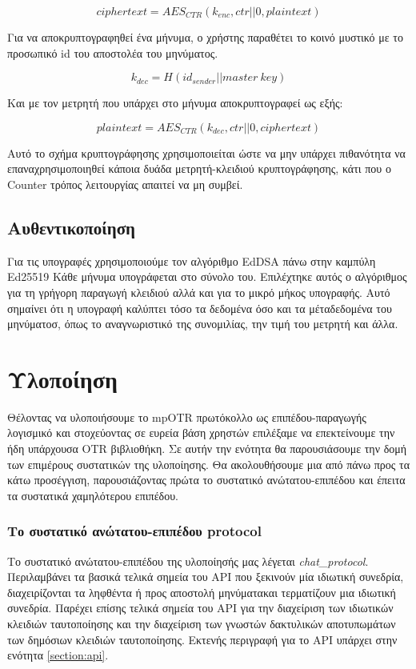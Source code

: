 \[
ciphertext = AES_{CTR}(k_{enc}, ctr||0, plaintext)
\]

Για να αποκρυπτογραφηθεί ένα μήνυμα, ο χρήστης παραθέτει το κοινό μυστικό με το προσωπικό id του αποστολέα του μηνύματος.

\[
k_{dec} = H(id_{sender} || master\ key)
\]

Και με τον μετρητή που υπάρχει στο μήνυμα αποκρυπτογραφεί ως εξής:

\[
plaintext = AES_{CTR}(k_{dec}, ctr||0, ciphertext)
\]

Αυτό το σχήμα κρυπτογράφησης χρησιμοποιείται ώστε να μην υπάρχει πιθανότητα να επαναχρησιμοποιηθεί κάποια δυάδα μετρητή-κλειδιού κρυπτογράφησης, κάτι που ο Counter τρόπος λειτουργίας απαιτεί να μη συμβεί.

\subsection{Αυθεντικοποίηση}

Για τις υπογραφές χρησιμοποιούμε τον αλγόριθμο EdDSA πάνω στην καμπύλη Ed25519
Κάθε μήνυμα υπογράφεται στο σύνολο του.
Επιλέχτηκε αυτός ο αλγόριθμος για τη γρήγορη παραγωγή κλειδιού αλλά και για το μικρό μήκος υπογραφής.
Αυτό σημαίνει ότι η υπογραφή καλύπτει τόσο τα δεδομένα όσο και τα μέταδεδομένα του μηνύματοσ, όπως το αναγνωριστικό της συνομιλίας, την τιμή του μετρητή και άλλα.

\section{Υλοποίηση}

Θέλοντας να υλοποιήσουμε το mpOTR πρωτόκολλο ως επιπέδου-παραγωγής λογισμικό και στοχεύοντας σε ευρεία βάση χρηστών επιλέξαμε να επεκτείνουμε την ήδη υπάρχουσα OTR βιβλιοθήκη. Σε αυτήν την ενότητα θα παρουσιάσουμε την δομή των επιμέρους συστατικών της υλοποίησης. Θα ακολουθήσουμε μια από πάνω προς τα κάτω προσέγγιση, παρουσιάζοντας πρώτα το συστατικό ανώτατου-επιπέδου και έπειτα τα συστατικά χαμηλότερου επιπέδου.

\subsubsection{Το συστατικό ανώτατου-επιπέδου protocol}
Το συστατικό ανώτατου-επιπέδου της υλοποίησής μας λέγεται \emph{chat\_protocol}. Περιλαμβάνει τα βασικά τελικά σημεία του API που ξεκινούν μία ιδιωτική συνεδρία, διαχειρίζονται τα ληφθέντα ή προς αποστολή μηνύματακαι τερματίζουν μια ιδιωτική συνεδρία. Παρέχει επίσης τελικά σημεία του API για την διαχείριση των ιδιωτικών κλειδιών ταυτοποίησης και την διαχείριση των γνωστών δακτυλικών αποτυπωμάτων των δημόσιων κλειδιών ταυτοποίησης. Εκτενής περιγραφή για το API υπάρχει στην ενότητα \ref{section:api}.

